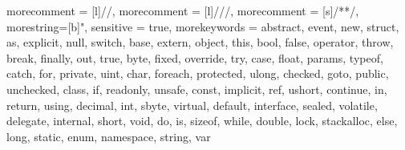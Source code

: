 {
 morecomment = [l]{//}, 
 morecomment = [l]{///},
 morecomment = [s]{/*}{*/},
 morestring=[b]", 
 sensitive = true,
 morekeywords = {abstract,  event,  new,  struct,
   as,  explicit,  null,  switch,
   base,  extern,  object,  this,
   bool,  false,  operator,  throw,
   break,  finally,  out,  true,
   byte,  fixed,  override,  try,
   case,  float,  params,  typeof,
   catch,  for,  private,  uint,
   char,  foreach,  protected,  ulong,
   checked,  goto,  public,  unchecked,
   class,  if,  readonly,  unsafe,
   const,  implicit,  ref,  ushort,
   continue,  in,  return,  using,
   decimal,  int,  sbyte,  virtual,
   default,  interface,  sealed,  volatile,
   delegate,  internal,  short,  void,
   do,  is,  sizeof,  while,
   double,  lock,  stackalloc,   
   else,  long,  static,   
   enum,  namespace, string, var}
}

\usepackage{color}
\usepackage{textcomp}
